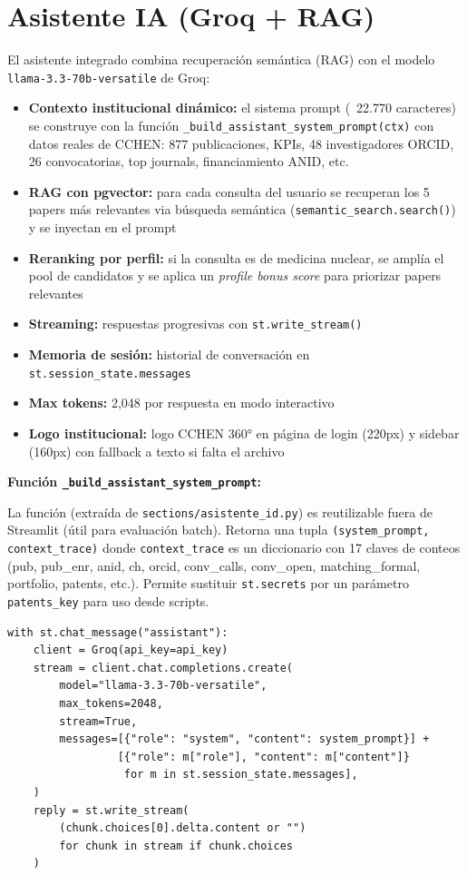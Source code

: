 \documentclass[12pt,a4paper]{report}
\begin{document}
\section{Asistente IA (Groq + RAG)}

El asistente integrado combina recuperación semántica (RAG) con el modelo \texttt{llama-3.3-70b-versatile} de Groq:

\begin{itemize}
  \item \textbf{Contexto institucional dinámico:} el sistema prompt (~22.770 caracteres) se construye con la función \texttt{\_build\_assistant\_system\_prompt(ctx)} con datos reales de CCHEN: 877 publicaciones, KPIs, 48 investigadores ORCID, 26 convocatorias, top journals, financiamiento ANID, etc.
  \item \textbf{RAG con pgvector:} para cada consulta del usuario se recuperan los 5 papers más relevantes via búsqueda semántica (\texttt{semantic\_search.search()}) y se inyectan en el prompt
  \item \textbf{Reranking por perfil:} si la consulta es de medicina nuclear, se amplía el pool de candidatos y se aplica un \textit{profile bonus score} para priorizar papers relevantes
  \item \textbf{Streaming:} respuestas progresivas con \texttt{st.write\_stream()}
  \item \textbf{Memoria de sesión:} historial de conversación en \texttt{st.session\_state.messages}
  \item \textbf{Max tokens:} 2{,}048 por respuesta en modo interactivo
  \item \textbf{Logo institucional:} logo CCHEN 360° en página de login (220px) y sidebar (160px) con fallback a texto si falta el archivo
\end{itemize}

\textbf{Función \texttt{\_build\_assistant\_system\_prompt}:}

La función (extraída de \texttt{sections/asistente\_id.py}) es reutilizable fuera de Streamlit (útil para evaluación batch). Retorna una tupla \texttt{(system\_prompt, context\_trace)} donde \texttt{context\_trace} es un diccionario con 17 claves de conteos (pub, pub\_enr, anid, ch, orcid, conv\_calls, conv\_open, matching\_formal, portfolio, patents, etc.). Permite sustituir \texttt{st.secrets} por un parámetro \texttt{patents\_key} para uso desde scripts.

\begin{lstlisting}[style=pythonstyle, caption={Implementación del streaming con Groq}]
with st.chat_message("assistant"):
    client = Groq(api_key=api_key)
    stream = client.chat.completions.create(
        model="llama-3.3-70b-versatile",
        max_tokens=2048,
        stream=True,
        messages=[{"role": "system", "content": system_prompt}] +
                 [{"role": m["role"], "content": m["content"]}
                  for m in st.session_state.messages],
    )
    reply = st.write_stream(
        (chunk.choices[0].delta.content or "")
        for chunk in stream if chunk.choices
    )
\end{lstlisting}
\end{document}

